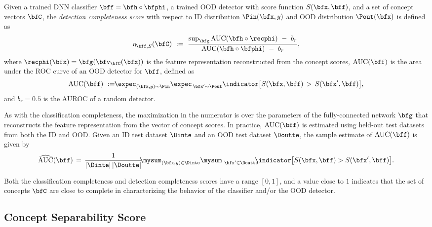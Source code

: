 \begin{definition}
\label{def:completeness_detec}
Given a trained DNN classifier $\bff = \bfh \circ \bfphi$, a trained OOD detector with score function $S(\bfx, \bff)$, and a set of concept vectors $\bfC$, the {\em detection completeness score} with respect to ID distribution $\Pin(\bfx, y)$ and OOD distribution $\Pout(\bfx)$ is defined as
\begin{align}
\label{equ: completeness-detection}
    \eta^{}_{\bff, S}(\bfC) 
    ~:=~ \frac{\textrm{sup}_\bfg \,\textrm{AUC}(\bfh \circ \recphi) ~-~ b_r}{\textrm{AUC}(\bfh \circ \bfphi) ~-~ b_r},
\end{align}
where $\recphi(\bfx) = \bfg(\bfv_{\bfC}(\bfx))$ is the feature representation reconstructed from the concept scores, $\textrm{AUC}(\bff)$ is the area under the ROC curve of an OOD detector for $\bff$, defined as
\begin{align}
\label{equ:auroc_ideal}
\textrm{AUC}(\bff) ~:= \!\!\expec_{(\bfx, y) \sim \Pin} \expec_{\,\bfx^\prime \sim \Pout} \indicator\big[ S(\bfx, \bff) \,>\, S(\bfx^\prime, \bff) \big],
\end{align}
and $b_r = 0.5$ is the AUROC of a random detector.
\end{definition}
As with the classification completeness, the maximization in the numerator is over the parameters of the fully-connected network $\bfg$ that reconstructs the feature representation from the vector of concept scores.
In practice, $\textrm{AUC}(\bff)$ is estimated using held-out test datasets from both the ID and OOD. Given an ID test dataset $\Dinte$ and an OOD test dataset $\Doutte$, the sample estimate of $\textrm{AUC}(\bff)$ is given by
\begin{align*}
    \widehat{\textrm{AUC}}(\bff) \,=\, \frac{1}{|\Dinte|\,|\Doutte|} \!\!\mysum_{(\bfx, y) \in \Dinte} \mysum_{~\bfx^\prime \in \Doutte} \!\!\!\indicator\big[ S(\bfx, \bff) > S(\bfx^\prime, \bff) \big]. 
\end{align*}

Both the classification completeness and detection completeness scores have a range $[0, 1]$, and a value close to $1$ indicates that the set of concepts $\bfC$ are close to complete in characterizing the behavior of the classifier and/or the OOD detector.

\subsection{Concept Separability Score}
\label{sec:separability_score}
\iffalse

